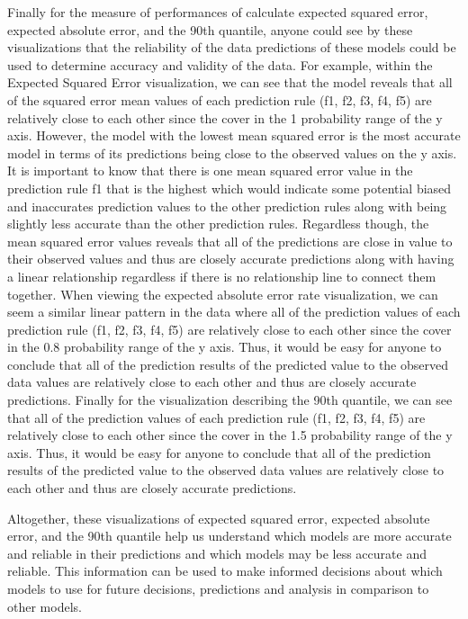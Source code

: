 \documentclass[
  letterpaper,
  DIV=11,
  numbers=noendperiod]{scrreprt}
\begin{document}
Finally for the measure of performances of calculate expected squared
error, expected absolute error, and the 90th quantile, anyone could see
by these visualizations that the reliability of the data predictions of
these models could be used to determine accuracy and validity of the
data. For example, within the Expected Squared Error visualization, we
can see that the model reveals that all of the squared error mean values
of each prediction rule (f1, f2, f3, f4, f5) are relatively close to
each other since the cover in the 1 probability range of the y axis.
However, the model with the lowest mean squared error is the most
accurate model in terms of its predictions being close to the observed
values on the y axis. It is important to know that there is one mean
squared error value in the prediction rule f1 that is the highest which
would indicate some potential biased and inaccurates prediction values
to the other prediction rules along with being slightly less accurate
than the other prediction rules. Regardless though, the mean squared
error values reveals that all of the predictions are close in value to
their observed values and thus are closely accurate predictions along
with having a linear relationship regardless if there is no relationship
line to connect them together. When viewing the expected absolute error
rate visualization, we can seem a similar linear pattern in the data
where all of the prediction values of each prediction rule (f1, f2, f3,
f4, f5) are relatively close to each other since the cover in the 0.8
probability range of the y axis. Thus, it would be easy for anyone to
conclude that all of the prediction results of the predicted value to
the observed data values are relatively close to each other and thus are
closely accurate predictions. Finally for the visualization describing
the 90th quantile, we can see that all of the prediction values of each
prediction rule (f1, f2, f3, f4, f5) are relatively close to each other
since the cover in the 1.5 probability range of the y axis. Thus, it
would be easy for anyone to conclude that all of the prediction results
of the predicted value to the observed data values are relatively close
to each other and thus are closely accurate predictions.

Altogether, these visualizations of expected squared error, expected
absolute error, and the 90th quantile help us understand which models
are more accurate and reliable in their predictions and which models may
be less accurate and reliable. This information can be used to make
informed decisions about which models to use for future decisions,
predictions and analysis in comparison to other models.
\end{document}

